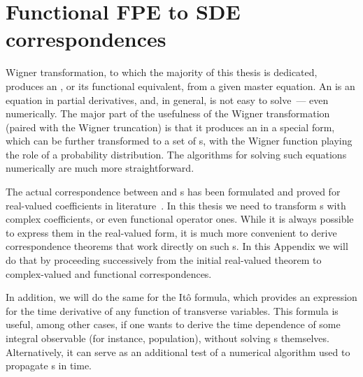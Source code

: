 \chapter{Functional FPE to SDE correspondences}
\label{cha:appendix:fpe-sde}

Wigner transformation, to which the majority of this thesis is dedicated, produces an , or its functional equivalent, from a given master equation.
An  is an equation in partial derivatives, and, in general, is not easy to solve~--- even numerically.
The major part of the usefulness of the Wigner transformation (paired with the Wigner truncation) is that it produces an  in a special form, which can be further transformed to a set of s, with the Wigner function playing the role of a probability distribution.
The algorithms for solving such equations numerically are much more straightforward.

The actual correspondence between  and s has been formulated and proved for real-valued coefficients in literature~\cite{Risken1996}.
In this thesis we need to transform s with complex coefficients, or even functional operator ones.
While it is always possible to express them in the real-valued form, it is much more convenient to derive correspondence theorems that work directly on such s.
In this Appendix we will do that by proceeding successively from the initial real-valued theorem to complex-valued and functional correspondences.

In addition, we will do the same for the It\^o formula, which provides an expression for the time derivative of any function of transverse variables.
This formula is useful, among other cases, if one wants to derive the time dependence of some integral observable (for instance, population), without solving s themselves.
Alternatively, it can serve as an additional test of a numerical algorithm used to propagate s in time.




